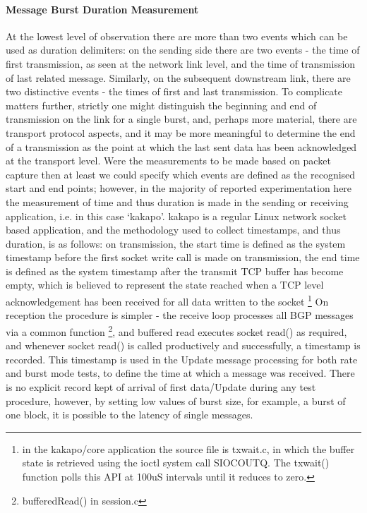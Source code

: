 \paragraph{Message Burst Duration Measurement}
At the lowest level of observation there are more than two events which can be used as duration delimiters: on the sending side there are two events - the time of first transmission, as seen at the network link level, and the time of transmission of last related message.
Similarly, on the subsequent downstream link, there are two distinctive events - the times of first and last transmission.
To complicate matters further, strictly one might distinguish the beginning and end of transmission on the link for a single burst, and, perhaps more material, there are transport protocol aspects, and it may be more meaningful to determine the end of a transmission as the point at which the last sent data has been acknowledged at the transport level.
Were the measurements to be made based on packet capture then at least we could specify which events are defined as the recognised start and end points; however, in the majority of reported experimentation here the measurement of time and thus duration is made in the sending or receiving application, i.e. in this case `kakapo'.
kakapo is a regular Linux network socket based application, and the methodology used to collect timestamps, and thus duration, is as follows: on transmission, the start time is defined as the system timestamp before the first socket write call is made on transmission, the end time is defined as the system timestamp after the transmit TCP buffer has become empty, which is believed to represent the state reached when a TCP level acknowledgement has been received for all data written to the socket \footnote{in the kakapo/core application the source file is txwait.c, in which the buffer state is retrieved using the ioctl 
system call SIOCOUTQ.
The txwait() function polls this API at 100uS intervals until it reduces to zero.}
On reception the procedure is simpler - the receive loop processes all BGP messages via a common function \footnote{bufferedRead() in session.c}, and buffered read executes socket read() as required, and whenever socket read() is called productively and successfully, a timestamp is recorded.
This timestamp is used in the Update message processing for both rate and burst mode tests, to define the time at which a message was received.
There is no explicit record kept of arrival of first data/Update during any test procedure, however, by setting low values of burst size, for example, a burst of one block, it is possible to the latency of single messages.

